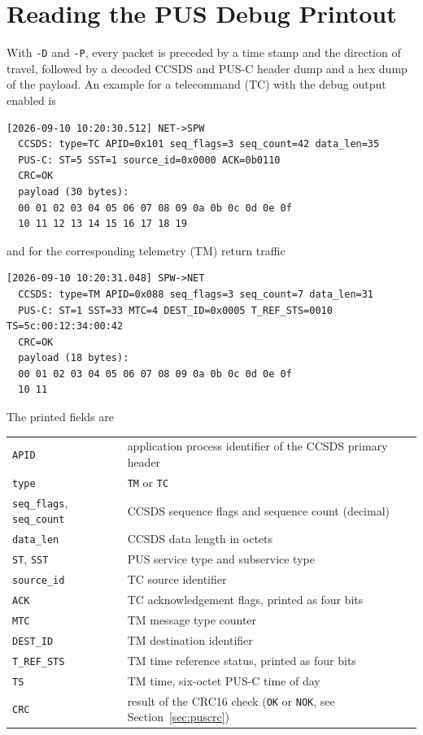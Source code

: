 \section{Reading the PUS Debug Printout}
\label{sec:pusdbg}

With \texttt{-D} and \texttt{-P}, every packet is preceded by a time stamp and
the direction of travel, followed by a decoded CCSDS and PUS-C header dump and
a hex dump of the payload. An example for a telecommand (TC) with the debug
output enabled is

\begin{lstlisting}
[2026-09-10 10:20:30.512] NET->SPW
  CCSDS: type=TC APID=0x101 seq_flags=3 seq_count=42 data_len=35
  PUS-C: ST=5 SST=1 source_id=0x0000 ACK=0b0110
  CRC=OK
  payload (30 bytes):
  00 01 02 03 04 05 06 07 08 09 0a 0b 0c 0d 0e 0f
  10 11 12 13 14 15 16 17 18 19
\end{lstlisting}

\noindent
and for the corresponding telemetry (TM) return traffic

\begin{lstlisting}
[2026-09-10 10:20:31.048] SPW->NET
  CCSDS: type=TM APID=0x088 seq_flags=3 seq_count=7 data_len=31
  PUS-C: ST=1 SST=33 MTC=4 DEST_ID=0x0005 T_REF_STS=0010 TS=5c:00:12:34:00:42
  CRC=OK
  payload (18 bytes):
  00 01 02 03 04 05 06 07 08 09 0a 0b 0c 0d 0e 0f
  10 11
\end{lstlisting}

\noindent
The printed fields are

\noindent
\begin{tabu} to 
	\texttt{APID}		& application process identifier of the CCSDS primary header \\
	\texttt{type}		& \texttt{TM} or \texttt{TC} \\
	\texttt{seq\_flags}, \texttt{seq\_count} & CCSDS sequence flags and sequence count (decimal) \\
	\texttt{data\_len}	& CCSDS data length in octets \\
	\texttt{ST}, \texttt{SST}& PUS service type and subservice type \\
	\texttt{source\_id}	& TC source identifier \\
	\texttt{ACK}		& TC acknowledgement flags, printed as four bits \\
	\texttt{MTC}		& TM message type counter \\
	\texttt{DEST\_ID}	& TM destination identifier \\
	\texttt{T\_REF\_STS}	& TM time reference status, printed as four bits \\
	\texttt{TS}		& TM time, six-octet PUS-C time of day \\
	\texttt{CRC}		& result of the CRC16 check (\texttt{OK} or \texttt{NOK}, see Section~\ref{sec:puscrc}) \\
\end{tabu}

